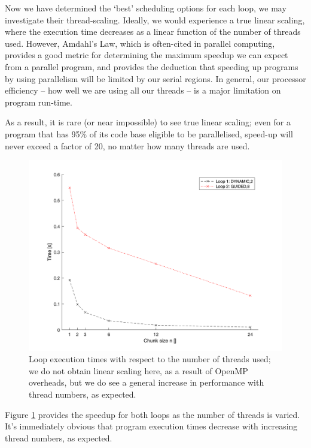 \documentclass{article} %
\begin{document}
Now we have determined the `best' scheduling options for each loop, we may investigate their thread-scaling.
Ideally, we would experience a true linear scaling, where the execution time decreases as a linear function of the number of threads used.
However, Amdahl's Law, which is often-cited in parallel computing, provides a good metric for determining the maximum speedup we can expect from a parallel program, and provides the deduction that speeding up programs by using parallelism will be limited by our serial regions. 
In general, our processor efficiency -- how well we are using all our threads -- is a major limitation on program run-time.

As a result, it is rare (or near impossible) to see true linear scaling; even for a program that has 95\% of its code base eligible to be parallelised, speed-up will never exceed a factor of 20, no matter how many threads are used.

\begin{figure}
    \centering
    \includegraphics[height=.35\textheight]{part1_plots/bestruns_all}
    \caption{Loop execution times with respect to the number of threads used; we do not obtain linear scaling here, as a result of OpenMP overheads, but we do see a general increase in performance with thread numbers, as expected.}
    \label{fig:threadall}
\end{figure}

Figure \ref{fig:threadall} provides the speedup for both loops as the number of threads is varied.
It's immediately obvious that program execution times decrease with increasing thread numbers, as expected.
\end{document}
